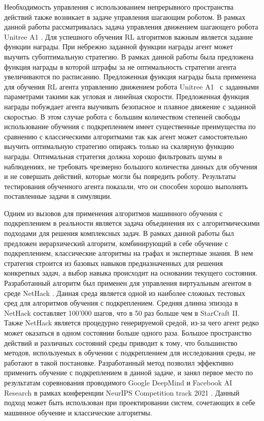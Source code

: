 Необходимость управления с использованием непрерывного пространства действий также возникает в задаче управления шагающим роботом. В рамках данной работы рассматривалась задача управления движением шагающего робота Unitree A1 \cite{rl_unitree}. Для успешного обучения RL алгоритмов важным является задание функции награды. При небрежно заданной функции награды агент может выучить субоптимальную стратегию. В рамках данной работы была предложена функция награды в которой штрафы за не оптимальность стратегии агента увеличиваются по расписанию. Предложенная функция награды была применена для обучения RL агента управлению движением робота Unitree A1~\cite{unitree} с заданными параметрами такими как угловая и линейная скорости. Предложенная функция награды побуждает агента выучивать безопасное и плавное движение с заданной скоростью. В этом случае робота с большим количеством степеней свободы использование обучения с подкреплением имеет существенные преимущества по сравнению с классическими алгоритмами так как агент может самостоятельно выучить оптимальную стратегию опираясь только на скалярную функцию награды. Оптимальная стратегия должна хорошо фильтровать шумы в наблюдениях, не требовать чрезмерно большого количества данных для обучения и не совершать действий, которые могли бы повредить роботу. Результаты тестирования обученного агента показали, что он способен хорошо выполнять поставленные задачи в симуляции.

Одним из вызовов для применения алгоритмов машинного обучения с подкреплением в реальности является задача объединения их с алгоритмическими подходами для решения комплексных задач. В рамках данной работы был предложен иерархический алгоритм, комбинирующий в себе обучение с подкреплением, классические алгоритмы на графах и экспертные знания. В нем стратегия строится из базовых навыков предназначенных для решения конкретных задач, а выбор навыка происходит на основании текущего состояния. 
Разработанный алгоритм был применен для управления виртуальным агентом в среде NetHack \cite{nethack}. Данная среда является одной из наиболее сложных тестовых сред для алгоритмов обучения с подкреплением. Средняя длинна эпизода в NetHack составляет 100'000 шагов, что в 50 раз больше чем в StarCraft II. Также NetHack является процедурно генерируемой средой, из-за чего агент редко может оказаться в одном состоянии больше одного раза. Большое пространство действий и различных состояний среды приводит к тому, что большинство методов, используемых в обучении с подкреплением для исследования среды, не работают в такой постановке. Разработанный метод позволил эффективно применить обучение с подкреплением в данной задаче, и занял первое место по результатам соревнования проводимого Google DeepMind и Facebook AI Research в рамках конференции NeurIPS Competition track 2021 \cite{raph}. Данный подход может быть использован при проектировании систем, сочетающих в себе машинное обучение и классические алгоритмы. 



